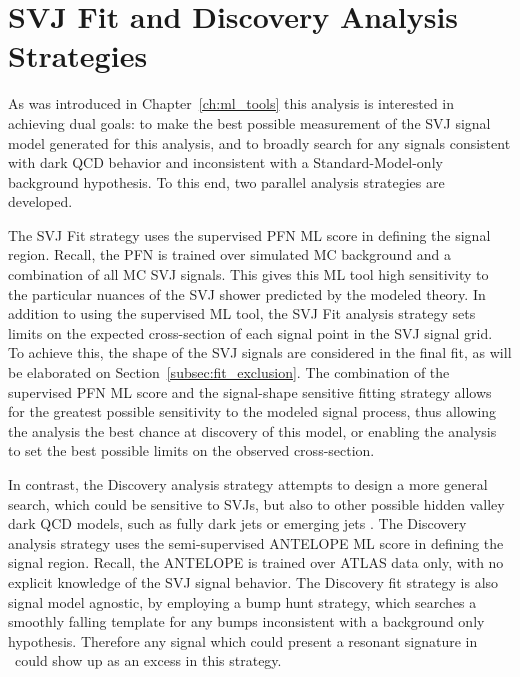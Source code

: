 

\section{SVJ Fit and Discovery Analysis Strategies}
\label{sec:strategies}
As was introduced in Chapter~\ref{ch:ml_tools} this analysis is interested in achieving dual goals: to make the best possible measurement of the SVJ signal model generated for this analysis, and to broadly search for any signals consistent with dark QCD behavior and inconsistent with a Standard-Model-only background hypothesis. To this end, two parallel analysis strategies are developed.\par

The SVJ Fit strategy uses the supervised PFN ML score in defining the signal region. Recall, the PFN is trained over simulated MC background and a combination of all MC SVJ signals. This gives this ML tool high sensitivity to the particular nuances of the SVJ shower predicted by the modeled theory. In addition to using the supervised ML tool, the SVJ Fit analysis strategy sets limits on the expected cross-section of each signal point in the SVJ signal grid. To achieve this, the shape of the SVJ signals are considered in the final fit, as will be elaborated on Section~\ref{subsec:fit_exclusion}. The combination of the supervised PFN ML score and the signal-shape sensitive fitting strategy allows for the greatest possible sensitivity to the modeled signal process, thus allowing the analysis the best chance at discovery of this model, or enabling the analysis to set the best possible limits on the observed cross-section.\par

In contrast, the Discovery analysis strategy attempts to design a more general search, which could be sensitive to SVJs, but also to other possible hidden valley dark QCD models, such as fully dark jets or emerging jets \cite{snowmass}. The Discovery analysis strategy uses the semi-supervised ANTELOPE ML score in defining the signal region. Recall, the ANTELOPE is trained over ATLAS data only, with no explicit knowledge of the SVJ signal behavior. The Discovery fit strategy is also signal model agnostic, by employing a bump hunt \cite{bumphunt} strategy, which searches a smoothly falling template for any bumps inconsistent with a background only hypothesis. Therefore any signal which could present a resonant signature in \mt~could show up as an excess in this strategy. \par

